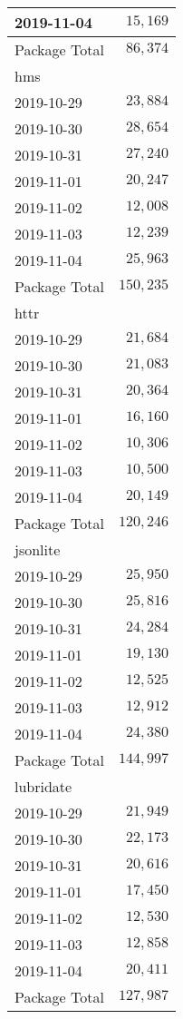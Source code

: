 \documentclass[]{article}
\begin{document}
\begin{longtable}{lr}
2019-11-04 & $15,169$ \\ 
\midrule 
Package Total & $86,374$ \\ 
\midrule
\multicolumn{1}{l}{hms} \\ 
\midrule
2019-10-29 & $23,884$ \\ 
2019-10-30 & $28,654$ \\ 
2019-10-31 & $27,240$ \\ 
2019-11-01 & $20,247$ \\ 
2019-11-02 & $12,008$ \\ 
2019-11-03 & $12,239$ \\ 
2019-11-04 & $25,963$ \\ 
\midrule 
Package Total & $150,235$ \\ 
\midrule
\multicolumn{1}{l}{httr} \\ 
\midrule
2019-10-29 & $21,684$ \\ 
2019-10-30 & $21,083$ \\ 
2019-10-31 & $20,364$ \\ 
2019-11-01 & $16,160$ \\ 
2019-11-02 & $10,306$ \\ 
2019-11-03 & $10,500$ \\ 
2019-11-04 & $20,149$ \\ 
\midrule 
Package Total & $120,246$ \\ 
\midrule
\multicolumn{1}{l}{jsonlite} \\ 
\midrule
2019-10-29 & $25,950$ \\ 
2019-10-30 & $25,816$ \\ 
2019-10-31 & $24,284$ \\ 
2019-11-01 & $19,130$ \\ 
2019-11-02 & $12,525$ \\ 
2019-11-03 & $12,912$ \\ 
2019-11-04 & $24,380$ \\ 
\midrule 
Package Total & $144,997$ \\ 
\midrule
\multicolumn{1}{l}{lubridate} \\ 
\midrule
2019-10-29 & $21,949$ \\ 
2019-10-30 & $22,173$ \\ 
2019-10-31 & $20,616$ \\ 
2019-11-01 & $17,450$ \\ 
2019-11-02 & $12,530$ \\ 
2019-11-03 & $12,858$ \\ 
2019-11-04 & $20,411$ \\ 
\midrule 
Package Total & $127,987$ \\ 

\end{longtable}
\end{document}
